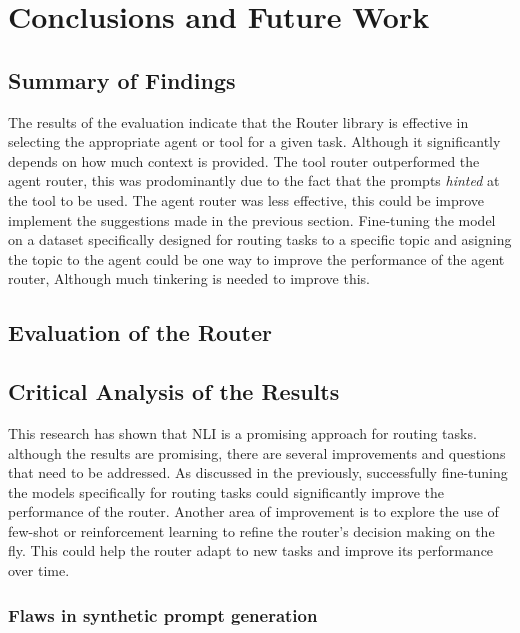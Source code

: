 \chapter{Conclusions and Future Work}
\label{ch:con}



\section{Summary of Findings}
\label{sec:summary-of-findings}

The results of the evaluation indicate that the Router library is effective in selecting the appropriate agent or tool for a given task. Although it significantly depends on how much context is provided. The tool router outperformed the agent router, this was prodominantly due to the fact that the prompts \textit{hinted} at the tool to be used. The agent router was less effective, this could be improve implement the suggestions made in the previous section. Fine-tuning the model on a dataset specifically designed for routing tasks to a specific topic and asigning the topic to the agent could be one way to improve the performance of the agent router, Although much tinkering is needed to improve this.


\section{Evaluation of the Router}
\label{sec:evaluation-of-the-router}


\section{Critical Analysis of the Results}
\label{sec:results-critical-analysis}

This research has shown that NLI is a promising approach for routing tasks. although the results are promising, there are several improvements and questions that need to be addressed. As discussed in the previously, successfully fine-tuning the models specifically for routing tasks could significantly improve the performance of the router. Another area of improvement is to explore the use of few-shot or reinforcement learning to refine the router's decision making on the fly. This could help the router adapt to new tasks and improve its performance over time.

\subsection{Flaws in synthetic prompt generation}
\label{sec:results-flaws-in-synthetic-prompt-generation}

